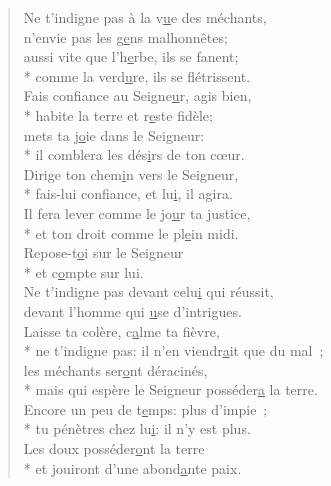 
\begin{verse}
Ne t’indigne pas à la v\underline{u}e des méchants, \\
n’envie pas les g\underline{e}ns malhonnêtes; \\
aussi vite que l’h\underline{e}rbe, ils se fanent; \\*
comme la verd\underline{u}re, ils se flétrissent. \\

Fais confiance au Seigne\underline{u}r, agis bien, \\*
habite la terre et r\underline{e}ste fidèle; \\
mets ta j\underline{o}ie dans le Seigneur: \\*
il comblera les dés\underline{i}rs de ton cœur. \\

Dirige ton chem\underline{i}n vers le Seigneur, \\*
fais-lui confiance, et lu\underline{i}, il agira. \\
Il fera lever comme le jo\underline{u}r ta justice, \\*
et ton droit comme le pl\underline{e}in midi. \\

Repose-t\underline{o}i sur le Seigneur \\*
et c\underline{o}mpte sur lui. \\
Ne t’indigne pas devant celu\underline{i} qui réussit, \\
devant l’homme qui \underline{u}se d’intrigues. \\

Laisse ta colère, c\underline{a}lme ta fièvre, \\*
ne t’indigne pas: il n’en viendr\underline{a}it que du mal ; \\
les méchants ser\underline{o}nt déracinés, \\*
mais qui espère le Seigneur posséder\underline{a} la terre. \\

Encore un peu de t\underline{e}mps: plus d’impie ; \\*
tu pénètres chez lu\underline{i}: il n’y est plus. \\
Les doux posséder\underline{o}nt la terre \\*
et jouiront d’une abond\underline{a}nte paix. \\


\end{verse}
